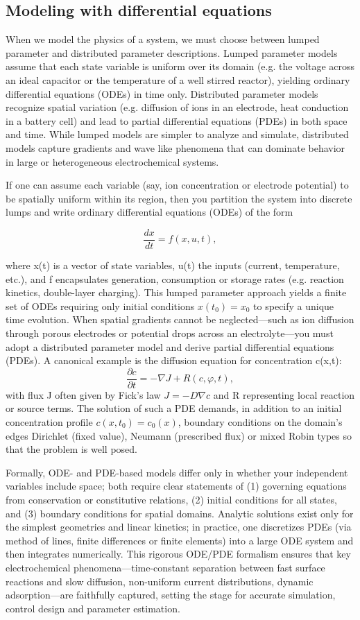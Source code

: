 \subsection{Modeling with differential equations}
When we model the physics of a system, we must choose between lumped parameter and distributed parameter descriptions.  Lumped parameter models assume that each state variable is uniform over its domain (e.g. the voltage across an ideal capacitor or the temperature of a well stirred reactor), yielding ordinary differential equations (ODEs) in time only.  Distributed parameter models recognize spatial variation (e.g. diffusion of ions in an electrode, heat conduction in a battery cell) and lead to partial differential equations (PDEs) in both space and time.  While lumped models are simpler to analyze and simulate, distributed models capture gradients and wave like phenomena that can dominate behavior in large or heterogeneous electrochemical systems.

 If one can assume each variable (say, ion concentration or electrode potential) to be spatially uniform within its region, then you partition the system into discrete lumps and write ordinary differential equations (ODEs) of the form

$$
\frac{dx}{dt} = f(x, u, t),
$$

where x(t) is a vector of state variables, u(t) the inputs (current, temperature, etc.), and f encapsulates generation, consumption or storage rates (e.g. reaction kinetics, double-layer charging). This lumped parameter approach yields a finite set of ODEs requiring only initial conditions $x(t_0)=x_0$ to specify a unique time evolution.
When spatial gradients cannot be neglected—such as ion diffusion through porous electrodes or potential drops across an electrolyte—you must adopt a distributed parameter model and derive partial differential equations (PDEs). A canonical example is the diffusion equation for concentration c(x,t):
$$
\frac{\partial c}{ \partial t} =-\nabla J + R(c,\varphi,t),
$$
with flux J often given by Fick's law $J= -D\nabla c$ and R representing local reaction or source terms. The solution of such a PDE demands, in addition to an initial concentration profile $c(x,t_0)=c_0(x)$, boundary conditions on the domain's edges Dirichlet (fixed value), Neumann (prescribed flux) or mixed Robin types so that the problem is well posed.

Formally, ODE- and PDE-based models differ only in whether your independent variables include space; both require clear statements of (1) governing equations from conservation or constitutive relations, (2) initial conditions for all states, and (3) boundary conditions for spatial domains. Analytic solutions exist only for the simplest geometries and linear kinetics; in practice, one discretizes PDEs (via method of lines, finite differences or finite elements) into a large ODE system and then integrates numerically. This rigorous ODE/PDE formalism ensures that key electrochemical phenomena—time-constant separation between fast surface reactions and slow diffusion, non-uniform current distributions, dynamic adsorption—are faithfully captured, setting the stage for accurate simulation, control design and parameter estimation.

